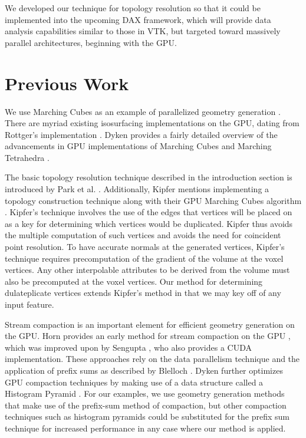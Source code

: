 \documentclass[journal]{vgtc}                %
\begin{document}
We developed our technique for topology resolution so that it could be implemented
into the upcoming DAX framework, which will provide data analysis capabilities similar to those
in VTK, but targeted toward massively parallel architectures, beginning with the GPU.

\section{Previous Work}

We use Marching Cubes as an example of parallelized geometry 
generation \cite{Lorensen1987}. There are myriad existing isosurfacing implementations on the GPU, dating from 
Rottger's implementation \cite{Rottger2000}. Dyken provides a fairly 
detailed overview of the advancements in GPU implementations of Marching Cubes and 
Marching Tetrahedra \cite{Dyken2008} .

The basic topology resolution technique described in the introduction section is
introduced by Park et al. \cite{Park}. Additionally, Kipfer mentions
implementing a topology construction technique along with their GPU
Marching Cubes algorithm \cite{Kipfer2005}. Kipfer's technique involves the use of the edges that vertices 
will be placed on as a key for determining which vertices would be duplicated. Kipfer 
thus avoids the multiple computation of such vertices and avoids the need for coincident 
point resolution. To have accurate normals at the generated vertices, Kipfer's technique
requires precomputation of the gradient of the volume at the voxel vertices. Any other
interpolable attributes to be derived from the volume must also be precomputed at the
voxel vertices. Our method for determining dulateplicate vertices extends Kipfer's method in that
we may key off of any input feature.

Stream compaction is an important element for efficient geometry generation on the GPU.
Horn provides an early method for stream compaction on the GPU \cite{Horn2005}, which
was improved upon by Sengupta \cite{Sengupta2007}, who also provides a CUDA implementation. 
These approaches rely on the data parallelism technique and the application of prefix sums 
as described by Blelloch \cite{Blelloch1990}. Dyken further optimizes
GPU compaction techniques by making use of a data structure called a Histogram Pyramid \cite{Dyken2008}.
For our examples, we use geometry generation methods that make use of the prefix-sum
method of compaction, but other compaction techniques such as histogram pyramids could be
substituted for the prefix sum technique for increased performance in any case where our method is applied.
\end{document}
